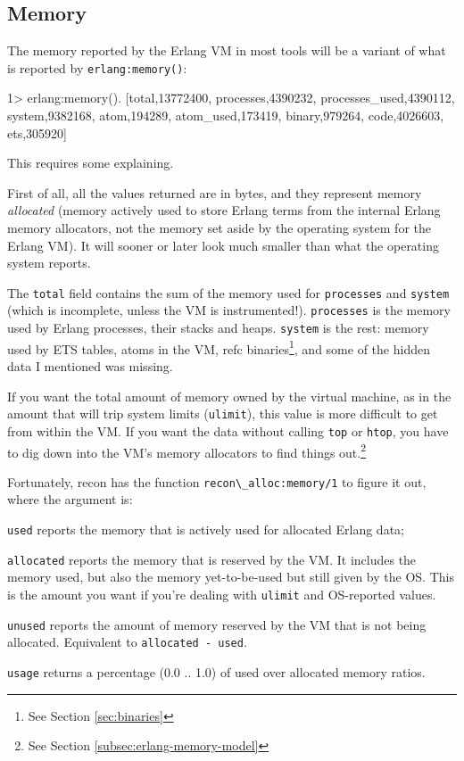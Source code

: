 \documentclass[11pt, oneside]{book}   	%
\newcommand{\app}[1]{\Verb`#1`}
\newcommand{\function}[1]{\Verb`#1`}
\newcommand{\expression}[1]{\Verb`#1`}
\begin{document}
\subsection{Memory}

The memory reported by the Erlang VM in most tools will be a variant of what is reported by \expression{erlang:memory()}:

\begin{VerbatimEshell}
1> erlang:memory().
[{total,13772400},
 {processes,4390232},
 {processes_used,4390112},
 {system,9382168},
 {atom,194289},
 {atom_used,173419},
 {binary,979264},
 {code,4026603},
 {ets,305920}]
\end{VerbatimEshell}

This requires some explaining.

First of all, all the values returned are in bytes, and they represent memory \emph{allocated} (memory actively used to store Erlang terms from the internal Erlang memory allocators, not the memory set aside by the operating system for the Erlang VM). It will sooner or later look much smaller than what the operating system reports.

The \expression{total} field contains the sum of the memory used for \expression{processes} and \expression{system} (which is incomplete, unless the VM is instrumented!). \expression{processes} is the memory used by Erlang processes, their stacks and heaps. \expression{system} is the rest: memory used by ETS tables, atoms in the VM, refc binaries\footnote{See Section \ref{sec:binaries}}, and some of the hidden data I mentioned was missing.

If you want the total amount of memory owned by the virtual machine, as in the amount that will trip system limits (\app{ulimit}), this value is more difficult to get from within the VM. If you want the data without calling \app{top} or \app{htop}, you have to dig down into the VM's memory allocators to find things out.\footnote{See Section \ref{subsec:erlang-memory-model}}

Fortunately, recon has the function \function{recon\_alloc:memory/1} to figure it out, where the argument is:

\begin{itemize*}
	\item \expression{used} reports the memory that is actively used for allocated Erlang data;
   	\item \expression{allocated} reports the memory that is reserved by the VM. It includes the memory used, but also the memory yet-to-be-used but still given by the OS. This is the amount you want if you're dealing with \app{ulimit} and OS-reported values.
	\item \expression{unused} reports the amount of memory reserved by the VM that is not being allocated. Equivalent to \expression{allocated - used}.
	\item \expression{usage} returns a percentage (0.0 .. 1.0) of used over allocated memory ratios.
\end{itemize*}
\end{document}
